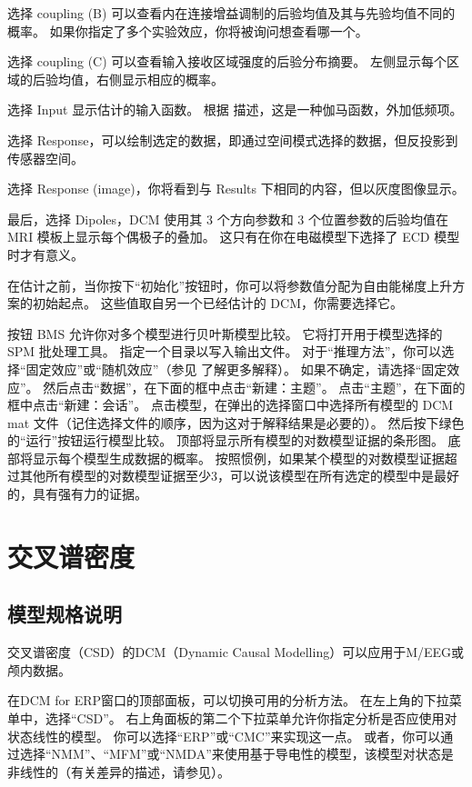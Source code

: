 选择 coupling (B) 可以查看内在连接增益调制的后验均值及其与先验均值不同的概率。
如果你指定了多个实验效应，你将被询问想查看哪一个。

选择 coupling (C) 可以查看输入接收区域强度的后验分布摘要。
左侧显示每个区域的后验均值，右侧显示相应的概率。

选择 Input 显示估计的输入函数。
根据 \cite{u29} 描述，这是一种伽马函数，外加低频项。

选择 Response，可以绘制选定的数据，即通过空间模式选择的数据，但反投影到传感器空间。

选择 Response (image)，你将看到与 Results 下相同的内容，但以灰度图像显示。

最后，选择 Dipoles，DCM 使用其 3 个方向参数和 3 个位置参数的后验均值在 MRI 模板上显示每个偶极子的叠加。
这只有在你在电磁模型下选择了 ECD 模型时才有意义。

在估计之前，当你按下“初始化”按钮时，你可以将参数值分配为自由能梯度上升方案的初始起点。
这些值取自另一个已经估计的 DCM，你需要选择它。

按钮 BMS 允许你对多个模型进行贝叶斯模型比较。
它将打开用于模型选择的 SPM 批处理工具。
指定一个目录以写入输出文件。
对于“推理方法”，你可以选择“固定效应”或“随机效应”（参见 \cite{u104} 了解更多解释）。
如果不确定，请选择“固定效应”。
然后点击“数据”，在下面的框中点击“新建：主题”。
点击“主题”，在下面的框中点击“新建：会话”。
点击模型，在弹出的选择窗口中选择所有模型的 DCM mat 文件（记住选择文件的顺序，因为这对于解释结果是必要的）。
然后按下绿色的“运行”按钮运行模型比较。
顶部将显示所有模型的对数模型证据的条形图。
底部将显示每个模型生成数据的概率。
按照惯例，如果某个模型的对数模型证据超过其他所有模型的对数模型证据至少3，可以说该模型在所有选定的模型中是最好的，具有强有力的证据。


\section{交叉谱密度}


\subsection{模型规格说明}

交叉谱密度（CSD）的DCM（Dynamic Causal Modelling）可以应用于M/EEG或颅内数据。

在DCM for ERP窗口的顶部面板，可以切换可用的分析方法。
在左上角的下拉菜单中，选择“CSD”。
右上角面板的第二个下拉菜单允许你指定分析是否应使用对状态线性的模型。
你可以选择“ERP”或“CMC”来实现这一点。
或者，你可以通过选择“NMM”、“MFM”或“NMDA”来使用基于导电性的模型，该模型对状态是非线性的（有关差异的描述，请参见\cite{u84}）。

